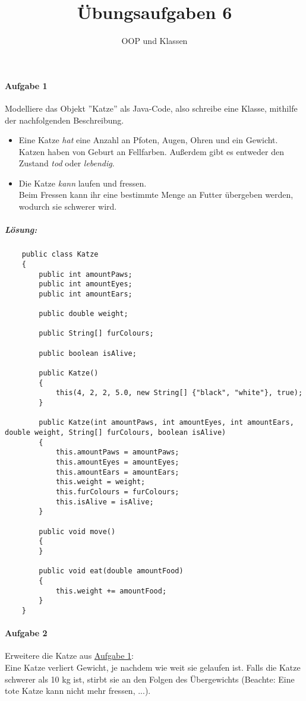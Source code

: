 \documentclass[12pt,a4paper,ngerman]{scrartcl}
\title{Übungsaufgaben 6}
\subtitle{OOP und Klassen}
\date{}
\begin{document}
	\maketitle
	
	\paragraph{Aufgabe 1}\mbox{}
	\label{A1}
	Modelliere das Objekt ''Katze'' als Java-Code, also schreibe eine Klasse, mithilfe der nachfolgenden Beschreibung.
	\begin{itemize}
		\item[] Eine Katze \emph{hat} eine Anzahl an Pfoten, Augen, Ohren und ein Gewicht. 	
				Katzen haben von Geburt an Fellfarben.
				Außerdem gibt es entweder den Zustand \emph{tod} oder \emph{lebendig}.
		
		\item[]	Die Katze \emph{kann} laufen und fressen.\\
				Beim Fressen kann ihr eine bestimmte Menge an Futter übergeben werden, wodurch sie schwerer wird.
	\end{itemize}

	\subparagraph{Lösung:}
	\begin{lstlisting}
	public class Katze
	{
		public int amountPaws;
		public int amountEyes;
		public int amountEars;
		
		public double weight;
		
		public String[] furColours;
		
		public boolean isAlive;
		
		public Katze()
		{
			this(4, 2, 2, 5.0, new String[] {"black", "white"}, true);
		}
		
		public Katze(int amountPaws, int amountEyes, int amountEars, double weight, String[] furColours, boolean isAlive)
		{
			this.amountPaws = amountPaws;
			this.amountEyes = amountEyes;
			this.amountEars = amountEars;
			this.weight = weight;
			this.furColours = furColours;
			this.isAlive = isAlive;
		}
		
		public void move()
		{
		}
		
		public void eat(double amountFood)
		{
			this.weight += amountFood;
		}
	}
	\end{lstlisting}
	\newpage
	\paragraph{Aufgabe 2}\mbox{}
	Erweitere die Katze aus \hyperref[A1]{Aufgabe 1}:\\
	Eine Katze verliert Gewicht, je nachdem wie weit sie gelaufen ist.
	Falls die Katze schwerer als 10 kg ist, stirbt sie an den Folgen des Übergewichts (Beachte: Eine tote Katze kann nicht mehr fressen, ...).
	
\end{document}
